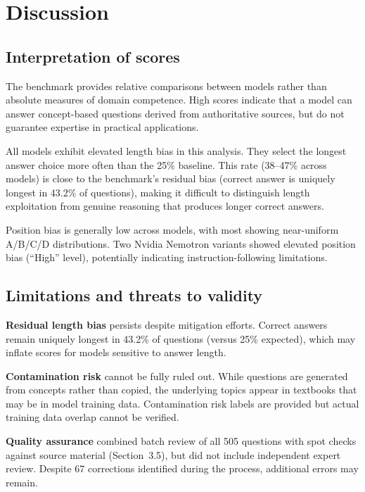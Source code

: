 \documentclass[11pt]{article}
\begin{document}

\section{Discussion}

\subsection{Interpretation of scores}

The benchmark provides relative comparisons between models rather than absolute measures of domain competence. High scores indicate that a model can answer concept-based questions derived from authoritative sources, but do not guarantee expertise in practical applications.

All models exhibit elevated length bias in this analysis. They select the longest answer choice more often than the 25\% baseline. This rate (38--47\% across models) is close to the benchmark's residual bias (correct answer is uniquely longest in 43.2\% of questions), making it difficult to distinguish length exploitation from genuine reasoning that produces longer correct answers.

Position bias is generally low across models, with most showing near-uniform A/B/C/D distributions. Two Nvidia Nemotron variants showed elevated position bias (``High'' level), potentially indicating instruction-following limitations.

\subsection{Limitations and threats to validity}

\textbf{Residual length bias} persists despite mitigation efforts. Correct answers remain uniquely longest in 43.2\% of questions (versus 25\% expected), which may inflate scores for models sensitive to answer length.

\textbf{Contamination risk} cannot be fully ruled out. While questions are generated from concepts rather than copied, the underlying topics appear in textbooks that may be in model training data. Contamination risk labels are provided but actual training data overlap cannot be verified.

\textbf{Quality assurance} combined batch review of all 505 questions with spot checks against source material (Section~3.5), but did not include independent expert review. Despite 67 corrections identified during the process, additional errors may remain.
\end{document}
